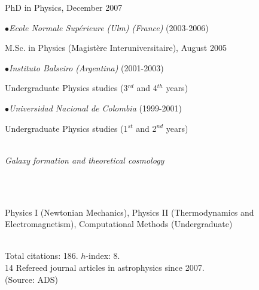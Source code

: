 \documentclass[10pt]{article}
\begin{document}
PhD in Physics, December 2007

\noindent$\bullet$\emph{Ecole Normale Sup\'erieure (Ulm) (France)} (2003-2006)

  M.Sc. in Physics (Magistère Interuniversitaire), August 2005

\noindent$\bullet$\emph{Instituto Balseiro (Argentina)} (2001-2003)

  Undergraduate Physics studies (3$^{rd}$ and 4$^{th}$ years)

\noindent$\bullet$\emph{Universidad Nacional de Colombia} (1999-2001)

  Undergraduate Physics studies (1$^{st}$ and 2$^{nd}$ years)\\


\\
\noindent\makebox[\linewidth]{\rule{\textwidth}{0.4pt}}%

\noindent\emph{Galaxy formation and theoretical cosmology}\\

\\
\noindent\makebox[\linewidth]{\rule{\textwidth}{0.4pt}}%

\\
\noindent\makebox[\linewidth]{\rule{\textwidth}{0.4pt}}%


\noindent Physics I (Newtonian Mechanics), Physics II (Thermodynamics and
Electromagnetism), Computational Methods (Undergraduate)\\

\\
\noindent\makebox[\linewidth]{\rule{\textwidth}{0.4pt}}%

\noindent 
Total citations: 186. $h$-index: 8.\\
14 Refereed journal articles in astrophysics since 2007.\\
(Source: ADS)\\
\end{document}
